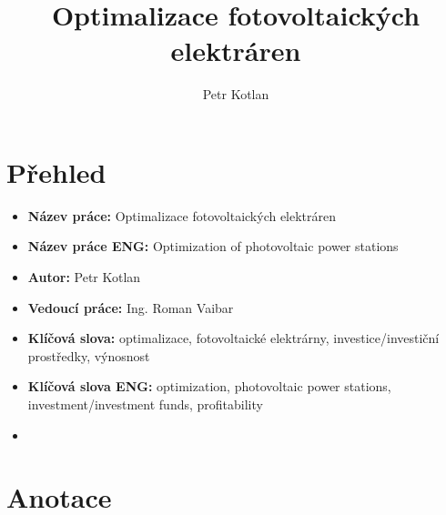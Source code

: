 \documentclass[a4paper, 12pt]{article}
\author{Petr Kotlan}
\title{Optimalizace fotovoltaických elektráren}
\date{}
\begin{document}
\maketitle
\tableofcontents
{}

\pagebreak


\section*{Přehled}

\begin{itemize}
    \item \textbf{Název práce:} Optimalizace fotovoltaických elektráren
    \item \textbf{Název práce ENG:} Optimization of photovoltaic power stations
    \item \textbf{Autor:} Petr Kotlan
    \item \textbf{Vedoucí práce:} Ing. Roman Vaibar
    \item \textbf{Klíčová slova:} optimalizace, fotovoltaické elektrárny, investice/investiční prostředky, výnosnost
    \item \textbf{Klíčová slova ENG:} optimization, photovoltaic power stations, investment/investment funds, profitability
    \item 

\end{itemize}


\section*{Anotace}
\end{document}
